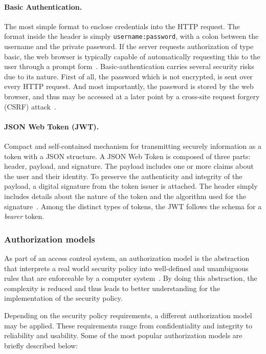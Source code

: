 \documentclass[12pt]{article}
\begin{document}
\paragraph{Basic Authentication.} The most simple format to enclose credentials into the HTTP request. The format inside the header is simply \texttt{username:password}, with a colon between the username and the private password. If the server requests authorization of type basic, the web browser is typically capable of automatically requesting this to the user through a prompt form~\cite{RFC7617}. Basic-authentication carries several security risks due to its nature. First of all, the password which is not encrypted, is sent over every HTTP request. And most importantly, the password is stored by the web browser, and thus may be accessed at a later point by a cross-site request forgery (CSRF) attack~\cite{basic_01}.

\paragraph{JSON Web Token (JWT).} Compact and self-contained mechanism for transmitting securely information as a token with a JSON structure. A JSON Web Token is composed of three parts: header, payload, and signature. The payload includes one or more claims about the user and their identity. To preserve the authenticity and integrity of the payload, a digital signature from the token issuer is attached. The header simply includes details about the nature of the token and the algorithm used for the signature~\cite{RFC7519}. Among the distinct types of tokens, the JWT follows the schema for a \emph{bearer} token. 

\subsubsection{Authorization models}

As part of an access control system, an authorization model is the abstraction that interprets a real world security policy into well-defined and unambiguous rules that are enforceable by a computer system~\cite{access_01}. By doing this abstraction, the complexity is reduced and thus leads to better understanding for the implementation of the security policy. 

Depending on the security policy requirements, a different authorization model may be applied. These requirements range from confidentiality and integrity to reliability and usability. Some of the most popular authorization models are briefly described below:
\end{document}
